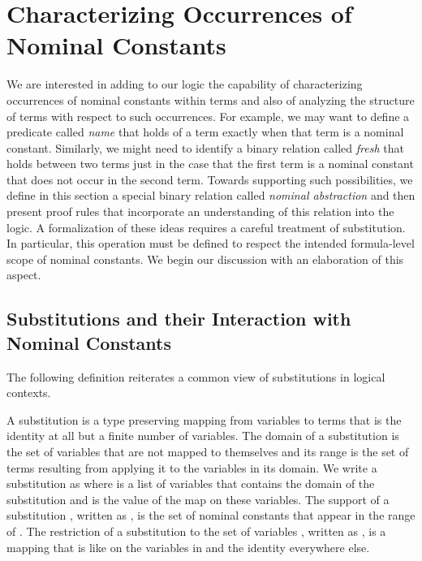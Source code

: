\section{Characterizing Occurrences of Nominal Constants}
\label{sec:nominal-abstraction}

We are interested in adding to our logic the capability of
characterizing occurrences of nominal constants within terms and also
of analyzing the structure of terms with respect to such
occurrences. For example, we may want to define a predicate called
{\em name} that holds of a term exactly when that term is a nominal
constant. Similarly, we might need to identify a binary relation
called {\em fresh} that holds between two terms just in the case that
the first term is a nominal constant that does not occur in the second
term. Towards supporting such possibilities, we define in this section
a special binary relation called {\it nominal abstraction} and then
present proof rules that incorporate an understanding of this relation
into the logic. A formalization of these ideas requires a careful
treatment of substitution. In particular, this operation must be
defined to respect the intended formula-level scope of nominal
constants. We begin our discussion with an elaboration of this aspect.

\subsection{Substitutions and their Interaction with Nominal Constants}

The following definition reiterates a common view of substitutions
in logical contexts.

\begin{definition}\label{subst}
A substitution is a type preserving mapping from variables
to terms that is the identity at all but a finite number of variables.
The domain of a substitution is the set of variables that are
not mapped to themselves and its range is the
set of terms resulting from applying it to the variables in its
domain.  We write a substitution as 
where  is a list of variables that contains the
domain of the substitution and  is the value of the
map on these variables. The support of a substitution ,
written as , is the set of nominal constants that appear in
the range of . The restriction of a substitution  to
the set of variables , written as , is a mapping that is like  on the variables in
 and the identity everywhere else.
\end{definition}

